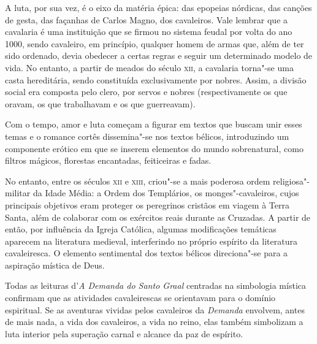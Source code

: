 \documentclass[11pt]{extarticle}
\begin{document}
A luta, por sua vez, é o eixo da matéria épica: das epopeias
nórdicas, das canções de gesta, das façanhas de Carlos Magno, dos
cavaleiros. Vale lembrar que a cavalaria é uma instituição que se firmou
no sistema feudal por volta do ano 1000, sendo cavaleiro, em princípio,
qualquer homem de armas que, além de ter sido ordenado, devia obedecer a
certas regras e seguir um determinado modelo de vida. No entanto, a
partir de meados do século \textsc{xii}, a cavalaria torna"-se uma casta
hereditária, sendo constituída exclusivamente por nobres. Assim, a
divisão social era composta pelo clero, por servos e nobres
(respectivamente os que oravam, os que trabalhavam e os que
guerreavam).

Com o tempo, amor e luta começam a figurar em textos que buscam
unir esses temas e o romance cortês dissemina"-se nos textos bélicos,
introduzindo um componente erótico em que se inserem elementos do mundo
sobrenatural, como filtros mágicos, florestas encantadas, feiticeiras e
fadas.

No entanto, entre os séculos \textsc{xii} e \textsc{xiii}, criou"-se a mais
poderosa ordem religiosa"-militar da Idade Média: a Ordem dos Templários,
os monges"-cavaleiros, cujos principais objetivos eram proteger os
peregrinos cristãos em viagem à Terra Santa, além de colaborar com os
exércitos reais durante as Cruzadas. A partir de então, por influência
da Igreja Católica, algumas modificações temáticas aparecem na
literatura medieval, interferindo no próprio espírito da literatura
cavaleiresca. O elemento sentimental dos textos bélicos direciona"-se
para a aspiração mística de Deus.




Todas as leituras d'\emph{A Demanda do Santo
Graal} centradas na simbologia mística confirmam que as atividades
cavaleirescas se orientavam para o domínio espiritual. Se as aventuras
vividas pelos cavaleiros da \emph{Demanda} envolvem, antes de mais nada,
a vida dos cavaleiros, a vida no reino, elas também simbolizam a luta
interior pela superação carnal e alcance da paz de
espírito.


\end{document}

